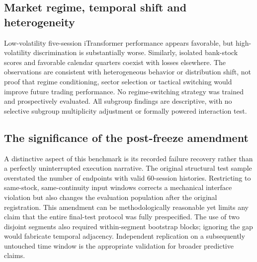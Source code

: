 \documentclass[fleqn,10pt]{wlscirep}
\begin{document}
\subsection{Market regime, temporal shift and heterogeneity}
Low-volatility five-session iTransformer performance appears favorable, but high-volatility discrimination is substantially worse. Similarly, isolated bank-stock scores and favorable calendar quarters coexist with losses elsewhere. The observations are consistent with heterogeneous behavior or distribution shift, not proof that regime conditioning, sector selection or tactical switching would improve future trading performance. No regime-switching strategy was trained and prospectively evaluated. All subgroup findings are descriptive, with no selective subgroup multiplicity adjustment or formally powered interaction test.

\subsection{The significance of the post-freeze amendment}
A distinctive aspect of this benchmark is its recorded failure recovery rather than a perfectly uninterrupted execution narrative. The original structural test sample overstated the number of endpoints with valid 60-session histories. Restricting to same-stock, same-continuity input windows corrects a mechanical interface violation but also changes the evaluation population after the original registration. This amendment can be methodologically reasonable yet limits any claim that the entire final-test protocol was fully prespecified. The use of two disjoint segments also required within-segment bootstrap blocks; ignoring the gap would fabricate temporal adjacency. Independent replication on a subsequently untouched time window is the appropriate validation for broader predictive claims.
\end{document}
